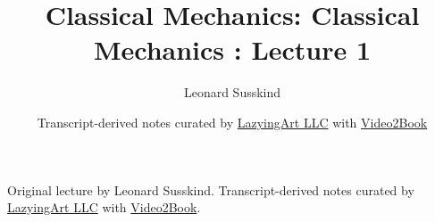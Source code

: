 \documentclass[11pt,oneside]{book}
\begin{document}
\frontmatter
\title{Classical Mechanics: Classical Mechanics : Lecture 1}
\author{Leonard Susskind}
\date{Transcript-derived notes curated by \href{https://lazying.art}{LazyingArt LLC} with \href{https://github.com/lachlanchen/Video2Book}{Video2Book}}
\maketitle
\begin{center}
\small Original lecture by Leonard Susskind. Transcript-derived notes curated by \href{https://lazying.art}{LazyingArt LLC} with \href{https://github.com/lachlanchen/Video2Book}{Video2Book}.
\end{center}
\clearpage
\mainmatter

\end{document}
